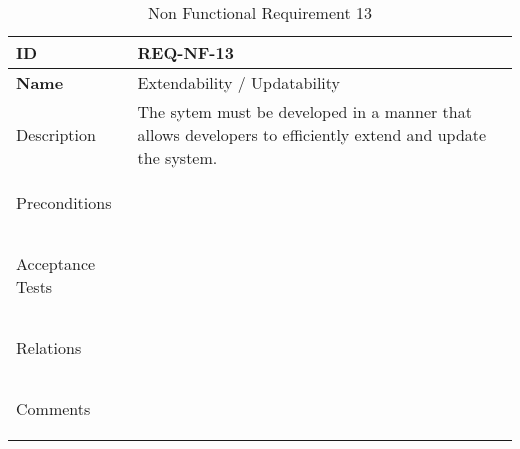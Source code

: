 \begin{table}[H]
    \begin{tabular}[t]{ | >{\bfseries}l | p{9.5cm} |}

    \hline
    ID
    &  REQ-NF-13 \\ \hline

    Name
    & Extendability / Updatability \\ \hline

    Description
    & The sytem must be developed in a manner that allows developers to efficiently extend and update the system. \\ \hline

    Preconditions
    &  \\ \hline

    Acceptance Tests
    & \\ \hline

    Relations
    &  \\ \hline

    Comments
    &  \\ \hline

    \end{tabular}

    \caption{Non Functional Requirement 13}
    \label{fig:req_nf_13}

\end{table}